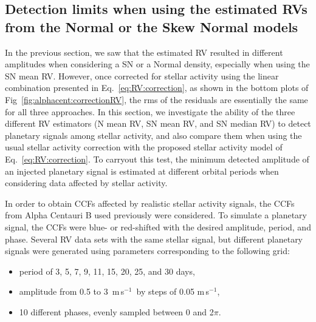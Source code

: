\documentclass{aa}
\def\ms{\hbox{\,m\,s$^{-1}$}}         %
\begin{document}
\subsection{Detection limits when using the estimated RVs from the Normal or the Skew Normal models} \label{sec:detect_limits}

In the previous section, we saw that the estimated RV resulted in different amplitudes when considering a SN or a Normal density, especially when using the SN mean RV. 
However, once corrected for stellar activity using the linear combination presented in Eq.~\eqref{eq:RV:correction}, as shown in the bottom plots of Fig~\ref{fig:alphacent:correctionRV}, the rms of the residuals are essentially the same for all three approaches.
In this section, we investigate the ability of the three different RV estimators (N mean RV, SN mean RV, and SN median RV) to detect planetary signals among stellar activity, and also compare them when using the usual stellar activity correction with the proposed stellar activity model of Eq.~\eqref{eq:RV:correction}.
To carryout this test, the minimum detected amplitude of an injected planetary signal is estimated at different orbital periods when considering data affected by stellar activity.

In order to obtain CCFs affected by realistic stellar activity signals, the CCFs from Alpha Centauri B used previously were considered. 
To simulate a planetary signal, the CCFs were blue- or red-shifted with the desired amplitude, period, and phase.
Several RV data sets with the same stellar signal, but different planetary signals were generated using parameters corresponding to the following grid:
\begin{itemize}
\item period of 3, 5, 7, 9, 11, 15, 20, 25, and 30 days,
\item amplitude from 0.5 to 3 \ms\, by steps of 0.05\,\ms,
\item 10 different phases, evenly sampled between 0 and 2$\pi$.
\end{itemize}
\end{document}
